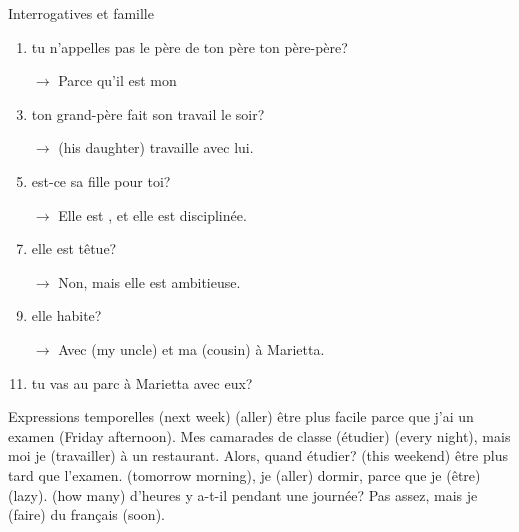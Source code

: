 \documentclass{beamer}
\begin{document}
  \begin{frame}{Interrogatives et famille}
    \begin{enumerate}
      \item \underline{} tu n'appelles pas le père de ton père ton père-père?
      \item[$\to$] Parce qu'il est mon \underline{}
      \item \underline{} ton grand-père fait son travail le soir?
      \item[$\to$] \underline{} (his daughter) travaille avec lui.
      \item \underline{} est-ce sa fille pour toi?
      \item[$\to$] Elle est \underline{}, et elle est disciplinée.
      \item \underline{}elle est têtue?
      \item[$\to$] Non, mais elle est ambitieuse.
      \item \underline{} elle habite?
      \item[$\to$] Avec \underline{} (my uncle) et ma \underline{} (cousin) à Marietta.
      \item \underline{} tu vas au parc à Marietta avec eux?
    \end{enumerate}
  \end{frame}

  \begin{frame}{Expressions temporelles}
    \underline{} (next week) \underline{} (aller) être plus facile parce que j'ai un examen \underline{} (Friday afternoon).
    Mes camarades de classe \underline{} (étudier) \underline{} (every night), mais moi je \underline{} (travailler) à un restaurant.
    Alors, quand étudier?
    \underline{} (this weekend) \underline{} être plus tard que l'examen.
    \underline{} (tomorrow morning), je \underline{} (aller) dormir, parce que je \underline{} (être) \underline{} (lazy).
    \underline{} (how many) d'heures y a-t-il pendant une journée?
    Pas assez, mais je \underline{} (faire) du français \underline{} (soon).
  \end{frame}
\end{document}
